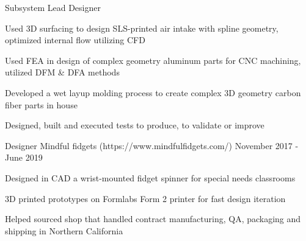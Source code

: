 \begin{cventries}
  \cventry
    {Subsystem Lead Designer} %
    {} %
    {} %
    {} %
    {
      \begin{cvitems} %
        \item{Used 3D surfacing to design SLS-printed air intake with spline geometry, optimized internal flow utilizing CFD}
        \item{Used FEA in design of complex geometry aluminum parts for CNC machining, utilized DFM \& DFA methods}
        \item{Developed a wet layup molding process to create complex 3D geometry carbon fiber parts in house}
        \item{Designed, built and executed tests to produce, to validate or improve}
      \end{cvitems}
    }

  \cventry
    {Designer} %
    {Mindful fidgets ({\tiny https://www.mindfulfidgets.com/})} %
    {} %
    {November 2017 - June 2019} %
    {
      \begin{cvitems} %
        \item{Designed in CAD a wrist-mounted fidget spinner for special needs classrooms}
        \item{3D printed prototypes on Formlabs Form 2 printer for fast design iteration}
        \item{Helped sourced shop that handled contract manufacturing, QA, packaging and shipping in Northern California}
      \end{cvitems}
    }

\end{cventries}
